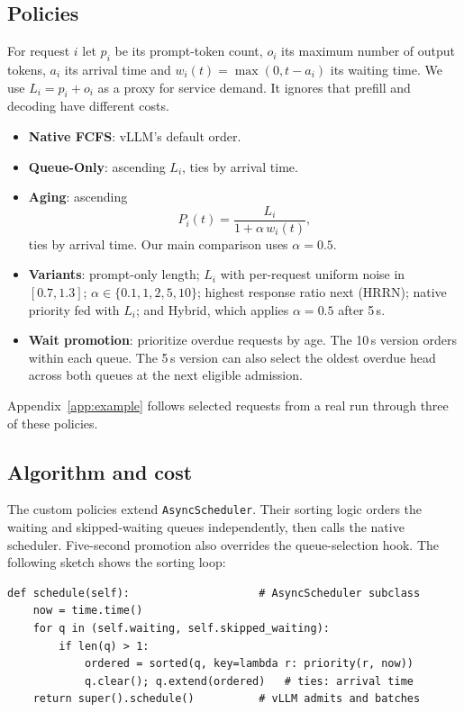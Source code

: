 \documentclass[sigplan,nonacm]{acmart}
\begin{document}
\subsection{Policies}
For request $i$ let $p_i$ be its prompt-token count, $o_i$ its maximum
number of output tokens, $a_i$ its arrival time and
$w_i(t)=\max(0,t-a_i)$ its waiting time. We use
$L_i=p_i+o_i$ as a proxy for service demand. It ignores that prefill and
decoding have different costs.

\begin{itemize}\setlength\itemsep{0pt}\setlength\parskip{0pt}
\item \textbf{Native FCFS}: vLLM's default order.
\item \textbf{Queue-Only}: ascending $L_i$, ties by arrival time.
\item \textbf{Aging}: ascending
\begin{equation}
  P_i(t)=\frac{L_i}{1+\alpha\,w_i(t)},
  \label{eq:aging}
\end{equation}
ties by arrival time. Our main comparison uses $\alpha=0.5$.
\item \textbf{Variants}: prompt-only length; $L_i$ with per-request
uniform noise in $[0.7,1.3]$; $\alpha\in\{0.1,1,2,5,10\}$;
highest response ratio next (HRRN); native priority fed with $L_i$;
and Hybrid, which applies $\alpha=0.5$ after 5\,s.
\item \textbf{Wait promotion}: prioritize overdue requests by age.
The 10\,s version orders within each queue. The 5\,s version
can also select the oldest overdue head across both queues at
the next eligible admission.
\end{itemize}
Appendix~\ref{app:example} follows selected requests from a real run
through three of these policies.

\subsection{Algorithm and cost}
The custom policies extend \texttt{AsyncScheduler}. Their sorting
logic orders the waiting and skipped-waiting queues independently,
then calls the native scheduler. Five-second promotion also overrides
the queue-selection hook. The following sketch shows the sorting loop:

\begin{lstlisting}
def schedule(self):                    # AsyncScheduler subclass
    now = time.time()
    for q in (self.waiting, self.skipped_waiting):
        if len(q) > 1:
            ordered = sorted(q, key=lambda r: priority(r, now))
            q.clear(); q.extend(ordered)   # ties: arrival time
    return super().schedule()          # vLLM admits and batches
\end{lstlisting}
\end{document}
